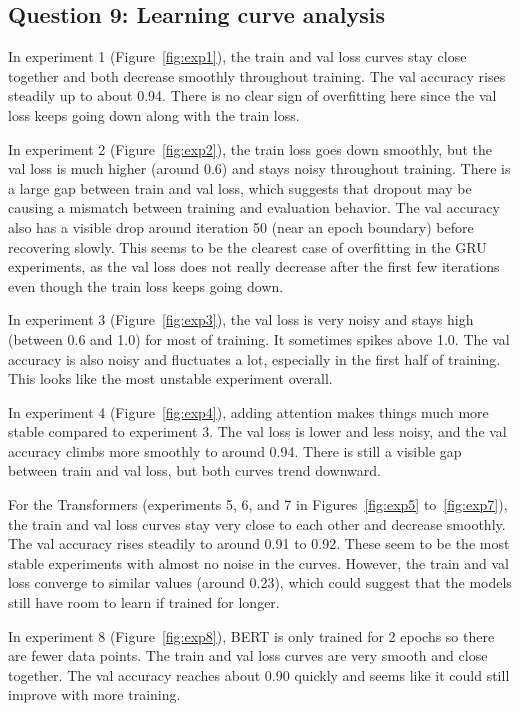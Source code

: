 \documentclass{article}
\begin{document}
\subsection*{Question 9: Learning curve analysis}

In experiment 1 (Figure~\ref{fig:exp1}), the train and val loss curves stay close together and both decrease smoothly throughout training. The val accuracy rises steadily up to about 0.94. There is no clear sign of overfitting here since the val loss keeps going down along with the train loss.

In experiment 2 (Figure~\ref{fig:exp2}), the train loss goes down smoothly, but the val loss is much higher (around 0.6) and stays noisy throughout training. There is a large gap between train and val loss, which suggests that dropout may be causing a mismatch between training and evaluation behavior. The val accuracy also has a visible drop around iteration 50 (near an epoch boundary) before recovering slowly. This seems to be the clearest case of overfitting in the GRU experiments, as the val loss does not really decrease after the first few iterations even though the train loss keeps going down.

In experiment 3 (Figure~\ref{fig:exp3}), the val loss is very noisy and stays high (between 0.6 and 1.0) for most of training. It sometimes spikes above 1.0. The val accuracy is also noisy and fluctuates a lot, especially in the first half of training. This looks like the most unstable experiment overall.

In experiment 4 (Figure~\ref{fig:exp4}), adding attention makes things much more stable compared to experiment 3. The val loss is lower and less noisy, and the val accuracy climbs more smoothly to around 0.94. There is still a visible gap between train and val loss, but both curves trend downward.

For the Transformers (experiments 5, 6, and 7 in Figures~\ref{fig:exp5} to~\ref{fig:exp7}), the train and val loss curves stay very close to each other and decrease smoothly. The val accuracy rises steadily to around 0.91 to 0.92. These seem to be the most stable experiments with almost no noise in the curves. However, the train and val loss converge to similar values (around 0.23), which could suggest that the models still have room to learn if trained for longer.

In experiment 8 (Figure~\ref{fig:exp8}), BERT is only trained for 2 epochs so there are fewer data points. The train and val loss curves are very smooth and close together. The val accuracy reaches about 0.90 quickly and seems like it could still improve with more training.
\end{document}
